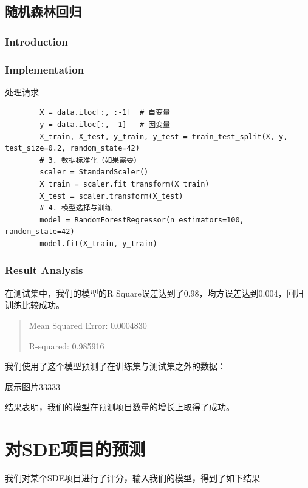 \documentclass[a4paper]{article}
\begin{document}
\subsection{随机森林回归}
\subsubsection{Introduction}


\subsubsection{Implementation}
\begin{listing}[htb]
	\caption{处理请求}
	\label{code:processdweet}
	\begin{verbatim}
        X = data.iloc[:, :-1]  # 自变量
        y = data.iloc[:, -1]   # 因变量
        X_train, X_test, y_train, y_test = train_test_split(X, y, test_size=0.2, random_state=42)
        # 3. 数据标准化（如果需要）
        scaler = StandardScaler()
        X_train = scaler.fit_transform(X_train)
        X_test = scaler.transform(X_test)
        # 4. 模型选择与训练
        model = RandomForestRegressor(n_estimators=100, random_state=42)
        model.fit(X_train, y_train)
\end{verbatim}
\end{listing}


\subsubsection{Result Analysis}
在测试集中，我们的模型的R Square误差达到了0.98，均方误差达到0.004，回归训练比较成功。

\begin{quote}
Mean Squared Error: 0.0004830

R-squared: 0.985916
\end{quote}


我们使用了这个模型预测了在训练集与测试集之外的数据：

展示图片33333

结果表明，我们的模型在预测项目数量的增长上取得了成功。



\section{对SDE项目的预测}
我们对某个SDE项目进行了评分，输入我们的模型，得到了如下结果
\end{document}
